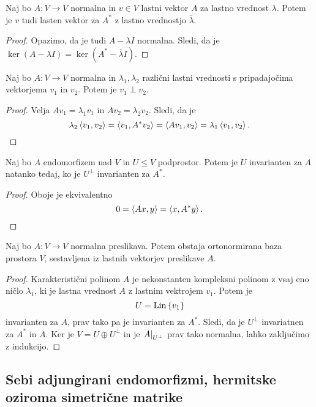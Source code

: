 \documentclass[12pt, a4paper]{article}
\begin{document}
\begin{trditev}
Naj bo $A\colon V\to V$ normalna in $v\in V$ lastni vektor $A$ za lastno vrednost $\lambda$. Potem je $v$ tudi lasten vektor za $A^*$ z lastno vrednostjo $\overline{\lambda}$.
\end{trditev}

\begin{proof}
Opazimo, da je tudi $A-\lambda I$ normalna. Sledi, da je $\ker(A-\lambda I)=\ker(A^*-\overline{\lambda}I)$.
\end{proof}

\begin{trditev}
Naj bo $A\colon V\to V$ normalna in $\lambda_1,\lambda_2$ različni lastni vrednosti s pripadajočima vektorjema $v_1$ in $v_2$. Potem je $v_1\perp v_2$.
\end{trditev}

\begin{proof}
Velja $Av_1=\lambda_1v_1$ in $Av_2=\lambda_2v_2$. Sledi, da je
\[
\lambda_2\left\langle v_1,v_2\right\rangle=\left\langle v_1,A^*v_2\right\rangle=\left\langle Av_1,v_2\right\rangle=\lambda_1\left\langle v_1,v_2\right\rangle.\qedhere
\]
\end{proof}

\begin{trditev}
Naj bo $A$ endomorfizem nad $V$ in $U\leq V$ podprostor. Potem je $U$ invarianten za $A$ natanko tedaj, ko je $U^\bot$ invarianten za $A^*$.
\end{trditev}

\begin{proof}
Oboje je ekvivalentno
\[
0=\left\langle Ax,y\right\rangle=\left\langle x,A^*y\right\rangle.\qedhere
\]
\end{proof}

\begin{izrek}
Naj bo $A\colon V\to V$ normalna preslikava. Potem obstaja ortonormirana baza prostora $V$, sestavljena iz lastnih vektorjev preslikave $A$.
\end{izrek}

\begin{proof}
Karakteristični polinom $A$ je nekonstanten kompleksni polinom z vsaj eno ničlo $\lambda_1$, ki je lastna vrednost $A$ z lastnim vektrojem $v_1$. Potem je
\[
U=\operatorname{Lin}\left\{v_1\right\}
\]
invarianten za $A$, prav tako pa je invarianten za $A^*$. Sledi, da je $U^\bot$ invariatnen za $A^*$ in $A$. Ker je $V=U\oplus U^\bot$ in je $\left. A\right|_{U^\bot}^{}$ prav tako normalna, lahko zaključimo z indukcijo.
\end{proof}

\newpage

\subsection{Sebi adjungirani endomorfizmi, hermitske oziroma simetrične matrike}
\end{document}
